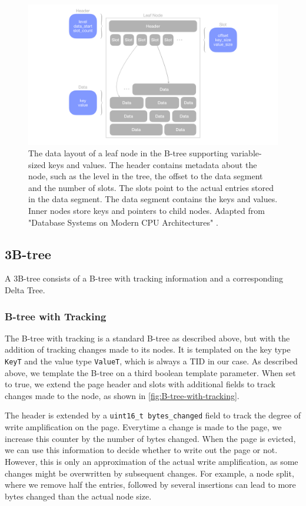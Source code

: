 \begin{figure}[htbp]
  \centering
  \includegraphics[width=1\textwidth]{figures/leaf_node.pdf}
  \caption{The data layout of a leaf node in the B-tree supporting variable-sized keys and values. The header contains metadata about the node, such as the level in the tree, the offset to the data segment and the number of slots. The slots point to the actual entries stored in the data segment. The data segment contains the keys and values. Inner nodes store keys and pointers to child nodes. Adapted from "Database Systems on Modern CPU Architectures" \autocite{mdbs2024slides}.}
  \label{fig:leaf-node}
\end{figure}

\subsection*{3B-tree}
\label{sec:3b-tree-implementation}

A 3B-tree consists of a B-tree with tracking information and a corresponding Delta Tree.

\subsubsection*{B-tree with Tracking}
The B-tree with tracking is a standard B-tree as described above, but with the addition of tracking changes made to its nodes.
It is templated on the key type \texttt{KeyT} and the value type \texttt{ValueT}, which is always a \ac{TID} in our case.
As described above, we template the B-tree on a third boolean template parameter.
When set to true, we extend the page header and slots with additional fields to track changes made to the node, as shown in \autoref{fig:B-tree-with-tracking}.

The header is extended by a \texttt{uint16\_t bytes\_changed} field to track the degree of write amplification on the page.
Everytime a change is made to the page, we increase this counter by the number of bytes changed.
When the page is evicted, we can use this information to decide whether to write out the page or not.
However, this is only an approximation of the actual write amplification, as some changes might be overwritten by subsequent changes.
For example, a node split, where we remove half the entries, followed by several insertions can lead to more bytes changed than the actual node size.


